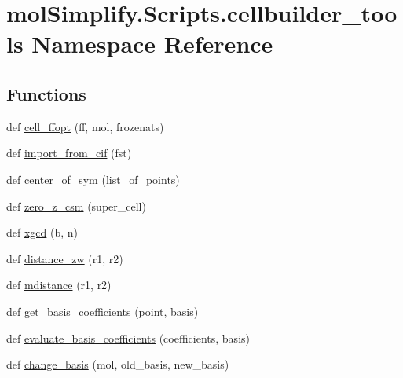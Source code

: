 \hypertarget{namespacemolSimplify_1_1Scripts_1_1cellbuilder__tools}{}\section{mol\+Simplify.\+Scripts.\+cellbuilder\+\_\+tools Namespace Reference}
\label{namespacemolSimplify_1_1Scripts_1_1cellbuilder__tools}
\subsection*{Functions}
\begin{DoxyCompactItemize}
\item 
def \hyperlink{namespacemolSimplify_1_1Scripts_1_1cellbuilder__tools_afa7cdfc8a30fd53f9784466e662d2aec}{cell\+\_\+ffopt} (ff, mol, frozenats)
\item 
def \hyperlink{namespacemolSimplify_1_1Scripts_1_1cellbuilder__tools_af7e25ca0eee7ea70e3d886dfac1b77ff}{import\+\_\+from\+\_\+cif} (fst)
\item 
def \hyperlink{namespacemolSimplify_1_1Scripts_1_1cellbuilder__tools_af7ec418e4139cc025c32ac5a789ec8bd}{center\+\_\+of\+\_\+sym} (list\+\_\+of\+\_\+points)
\item 
def \hyperlink{namespacemolSimplify_1_1Scripts_1_1cellbuilder__tools_a14494cd56f48f40e5437d8ca73f4b706}{zero\+\_\+z\+\_\+csm} (super\+\_\+cell)
\item 
def \hyperlink{namespacemolSimplify_1_1Scripts_1_1cellbuilder__tools_aa581e15be1f5816ef35d571cc0477100}{xgcd} (b, n)
\item 
def \hyperlink{namespacemolSimplify_1_1Scripts_1_1cellbuilder__tools_ab9c8e3fbb8626a035c3b4d7b64f13e57}{distance\+\_\+zw} (r1, r2)
\item 
def \hyperlink{namespacemolSimplify_1_1Scripts_1_1cellbuilder__tools_a85ce62198b383899fe614d5d32cfc59d}{mdistance} (r1, r2)
\item 
def \hyperlink{namespacemolSimplify_1_1Scripts_1_1cellbuilder__tools_a63c23a5bae677e610446b31f2eaca522}{get\+\_\+basis\+\_\+coefficients} (point, basis)
\item 
def \hyperlink{namespacemolSimplify_1_1Scripts_1_1cellbuilder__tools_acb88f739d432f6528c039e2131f212a1}{evaluate\+\_\+basis\+\_\+coefficients} (coefficients, basis)
\item 
def \hyperlink{namespacemolSimplify_1_1Scripts_1_1cellbuilder__tools_a188141938d45da5b263a09ad3b5606cd}{change\+\_\+basis} (mol, old\+\_\+basis, new\+\_\+basis)

\end{DoxyCompactItemize}
